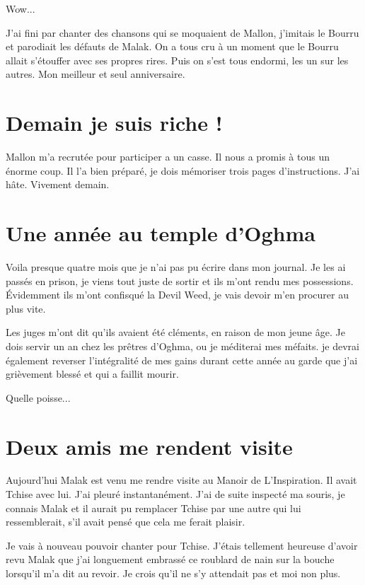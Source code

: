 \documentclass[10pt,a4paper,twoside,twocolumn,openany]{book}
\begin{document}
Wow...

J'ai fini par chanter des chansons qui se moquaient de Mallon, j'imitais le Bourru et parodiait
les défauts de Malak. On a tous cru à un moment que le Bourru allait s'étouffer avec ses propres rires.
Puis on s'est tous endormi, les un sur les autres. Mon meilleur et seul anniversaire.

\section{Demain je suis riche !}

Mallon m'a recrutée pour participer a un casse. Il nous a promis à tous un énorme coup. Il l'a bien 
préparé, je dois mémoriser trois pages d'instructions. J'ai hâte. Vivement demain.

\section{Une année au temple d'Oghma}

Voila presque quatre mois que je n'ai pas pu écrire dans mon journal. Je les ai
passés en prison, je viens tout juste de sortir et ils m'ont rendu mes possessions.
Évidemment ils m'ont confisqué la Devil Weed, je vais devoir m'en procurer au plus vite.
 
Les juges m'ont dit qu'ils avaient été cléments, en raison de mon jeune âge. Je dois servir un an
chez les prêtres d'Oghma, ou je méditerai mes méfaits. je devrai également reverser l'intégralité 
de mes gains durant cette année au garde que j'ai grièvement blessé et qui a faillit mourir.

Quelle poisse...

\section{Deux amis me rendent visite}

Aujourd'hui Malak est venu me rendre visite au Manoir de L'Inspiration.
Il avait Tchise avec lui. J'ai pleuré instantanément.
J'ai de suite inspecté ma souris, je connais Malak et il aurait pu remplacer Tchise par une autre
qui lui ressemblerait, s'il avait pensé que cela me ferait plaisir. 

Je vais à nouveau pouvoir chanter pour Tchise. J'étais tellement heureuse d'avoir revu
Malak que j'ai longuement embrassé ce roublard de nain sur la bouche lorsqu'il m'a dit au revoir. Je crois qu'il ne s'y 
attendait pas et moi non plus.
\end{document}
